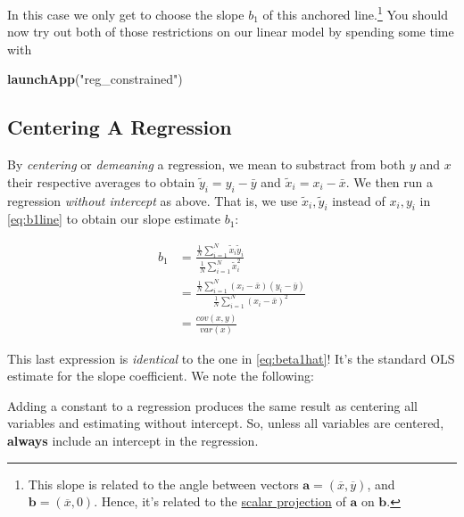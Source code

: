 \documentclass[]{book}
\newenvironment{Shaded}{\begin{snugshade}}{\end{snugshade}}
\newcommand{\KeywordTok}[1]{\textcolor[rgb]{0.13,0.29,0.53}{\textbf{#1}}}
\newcommand{\StringTok}[1]{\textcolor[rgb]{0.31,0.60,0.02}{#1}}
\newcommand{\NormalTok}[1]{#1}
\let\rmarkdownfootnote\footnote%
\def\footnote{\protect\rmarkdownfootnote}
\newenvironment{tip}{\begin{tcolorbox}[colback=green!5!white,colframe=green]}{\end{tcolorbox}}
\begin{document}
In this case we only get to choose the slope \(b_1\) of this anchored
line.\footnote{This slope is related to the angle between vectors
  \(\mathbf{a} = (\overline{x},\overline{y})\), and
  \(\mathbf{b} = (\overline{x},0)\). Hence, it's related to the
  \href{https://en.wikipedia.org/wiki/Scalar_projection}{scalar
  projection} of \(\mathbf{a}\) on \(\mathbf{b}\).} You should now try
out both of those restrictions on our linear model by spending some time
with

\begin{Shaded}
\begin{Highlighting}[]
\KeywordTok{launchApp}\NormalTok{(}\StringTok{"reg_constrained"}\NormalTok{)}
\end{Highlighting}
\end{Shaded}

\subsection{Centering A Regression}\label{centering-a-regression}

By \emph{centering} or \emph{demeaning} a regression, we mean to
substract from both \(y\) and \(x\) their respective averages to obtain
\(\tilde{y}_i = y_i - \bar{y}\) and \(\tilde{x}_i = x_i - \bar{x}\). We
then run a regression \emph{without intercept} as above. That is, we use
\(\tilde{x}_i,\tilde{y}_i\) instead of \(x_i,y_i\) in \eqref{eq:b1line} to
obtain our slope estimate \(b_1\):

\begin{align}
b_1 &= \frac{\frac{1}{N}\sum_{i=1}^N \tilde{x}_i \tilde{y}_i}{\frac{1}{N}\sum_{i=1}^N \tilde{x}_i^2}\\
    &= \frac{\frac{1}{N}\sum_{i=1}^N (x_i - \bar{x}) (y_i - \bar{y})}{\frac{1}{N}\sum_{i=1}^N (x_i - \bar{x})^2} \\
    &= \frac{cov(x,y)}{var(x)}
    \label{eq:bline-centered}
\end{align}

This last expression is \emph{identical} to the one in
\eqref{eq:beta1hat}! It's the standard OLS estimate for the slope
coefficient. We note the following:

\begin{tip}
Adding a constant to a regression produces the same result as centering
all variables and estimating without intercept. So, unless all variables
are centered, \textbf{always} include an intercept in the regression.
\end{tip}
\end{document}
